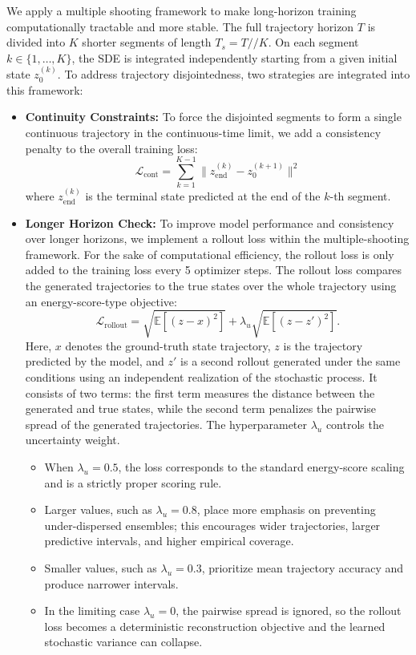 We apply a multiple shooting framework to make long-horizon training computationally tractable and more stable. The full trajectory horizon $T$ is divided into $K$ shorter segments of length $T_s=T//K$. On each segment $k \in \{1, \dots, K\}$, the SDE is integrated independently starting from a given initial state $z_0^{(k)}$. To address trajectory disjointedness, two strategies are integrated into this framework:
\begin{itemize}
    \item \textbf{Continuity Constraints:} To force the disjointed segments to form a single continuous trajectory in the continuous-time limit, we add a consistency penalty to the overall training loss:
    \begin{equation}
        \mathcal{L}_{\text{cont}} = \sum_{k=1}^{K-1} \| z_{\text{end}}^{(k)} - z_0^{(k+1)} \|^2
    \end{equation}
    where $z_{\text{end}}^{(k)}$ is the terminal state predicted at the end of the $k$-th segment.
    \item \textbf{Longer Horizon Check:} To improve model performance and consistency over longer horizons, we implement a rollout loss within the multiple-shooting framework. For the sake of computational efficiency, the rollout loss is only added to the training loss every 5 optimizer steps. The rollout loss compares the generated trajectories to the true states over the whole trajectory using an energy-score-type objective:
    \begin{equation}
        \mathcal{L}_{\text{rollout}} = \sqrt{\mathbb{E}[(z-x)^2]}+\lambda_u\sqrt{\mathbb{E}[(z-z')^2]}.
        \label{eq:flow_sde_rollout_loss}
    \end{equation}
    Here, $x$ denotes the ground-truth state trajectory, $z$ is the trajectory predicted by the model, and $z'$ is a second rollout generated under the same conditions using an independent realization of the stochastic process. It consists of two terms: the first term measures the distance between the generated and true states, while the second term penalizes the pairwise spread of the generated trajectories. The hyperparameter $\lambda_u$ controls the uncertainty weight. 
    \begin{itemize}
        \item When $\lambda_u=0.5$, the loss corresponds to the standard energy-score scaling and is a strictly proper scoring rule. 
        \item Larger values, such as $\lambda_u=0.8$, place more emphasis on preventing under-dispersed ensembles; this encourages wider trajectories, larger predictive intervals, and higher empirical coverage.
        \item Smaller values, such as $\lambda_u=0.3$, prioritize mean trajectory accuracy and produce narrower intervals.
        \item In the limiting case $\lambda_u=0$, the pairwise spread is ignored, so the rollout loss becomes a deterministic reconstruction objective and the learned stochastic variance can collapse.
    \end{itemize}
\end{itemize}

